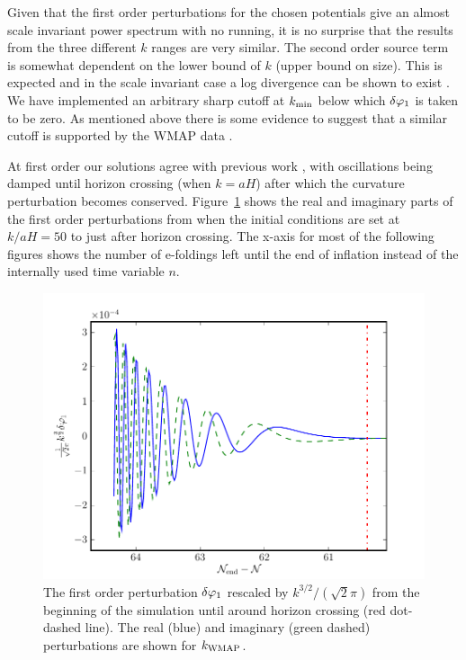 Given that the first order perturbations for the chosen potentials give an
almost scale invariant power spectrum with no running, it is no surprise that
the results from the three different $k$ ranges are very similar. The second
order source term is somewhat dependent on the lower bound of $k$ (upper bound
on size). This is expected and in the scale invariant case a log divergence can
be shown to exist \cite{Lyth:2007jh}. We have implemented an arbitrary sharp cutoff at $k_{\mathrm{min}}$
below
which 
$\delta\varphi_{1}$ is taken to be zero. As mentioned above there is some evidence to suggest that a 
similar cutoff is supported by the WMAP data \cite{Sinha:2005mn,Kim:2009pf}. 
% 

At first order our solutions agree with previous work
\cite{Salopek:1988qh,Martin:2006rs,Ringeval:2007am}, with oscillations
being damped until horizon crossing (when $k=aH$) after which the
curvature perturbation becomes conserved. Figure~\ref{fig:dp1} shows
the real and imaginary parts of the first order perturbations from
when the initial conditions are set at $k/aH=50$ to just after horizon
crossing. The x-axis for most of the following figures shows the
number of e-foldings left until the end of inflation instead of the
internally used time variable $n$.
%
% 
\begin{figure}
 \centering
 \includegraphics[scale=0.8]{numerical/graphs/dp1_kwmap}
 \caption{The first order perturbation $\delta\varphi_{1}$ rescaled by
$k^{3/2}/(\sqrt{2}\pi)$ from the beginning of the simulation until around
horizon crossing (red dot-dashed line). The real (blue) and imaginary (green
dashed) perturbations are shown for $k_\mathrm{WMAP}$.}
\label{fig:dp1}
\end{figure}
% 



